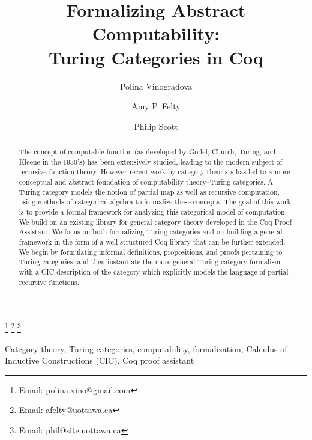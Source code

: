 \documentclass{entcs} \usepackage{entcsmacro}
\begin{document}
	\begin{frontmatter}
\title{Formalizing Abstract Computability:\\ Turing Categories in Coq} 
		\author[CS]{Polina Vinogradova}
		\author[CS,Math]{Amy P. Felty}
		\author[Math,CS]{Philip Scott}
		\address[CS]{School of Electrical Engineering and Computer Science, University of Ottawa, Ottawa, Canada}
		\address[Math]{Department of Mathematics and Statistics, University of Ottawa, Ottawa, Canada}
		\thanks[emailpv]{Email: polina.vino@gmail.com}
		\thanks[emailaf]{Email: afelty@uottawa.ca}
		\thanks[emailps]{Email: phil@site.uottawa.ca}


\begin{abstract} 
  The concept of computable function (as developed by G\"odel, Church,
  Turing, and Kleene in the 1930's) has been extensively studied,
  leading to the modern subject of recursive function theory. However
  recent work by category theorists has led to a more conceptual and
  abstract foundation of computability theory--Turing categories.
  A Turing category models the notion of partial map as well as
  recursive computation, using methods of categorical algebra to
  formalize these concepts.
  The goal of this work is to provide a formal framework for analyzing
  this categorical model of computation.  We build on an existing
  library for general category theory developed in the Coq Proof
  Assistant.  We focus on both formalizing Turing categories and on
  building a general framework in the form of a well-structured Coq
  library that can be further extended.
  We begin by formulating informal definitions, propositions, and
  proofs pertaining to Turing categories, and then instantiate the
  more general Turing category formalism with a CIC description of the
  category which explicitly models the language of partial recursive
  functions.
\end{abstract}
\begin{keyword}
Category theory, Turing categories, computability, formalization, Calculus of Inductive Constructions (CIC), Coq proof assistant
\end{keyword}		
\end{frontmatter}
\end{document}
